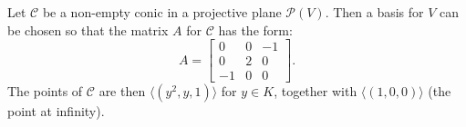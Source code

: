 Let $\mathcal{C}$ be a non-empty conic in a projective plane $\mathcal{P}(V)$. Then a basis for $V$ can be chosen so that the matrix $A$ for $\mathcal{C}$ has the form:
$$A = \begin{bmatrix} 0 & 0 & -1 \\ 0 & 2 & 0 \\ -1 & 0 & 0 \end{bmatrix}.$$
The points of $\mathcal{C}$ are then $\langle (y^2, y, 1) \rangle$ for $y \in K$, together with $\langle (1, 0, 0) \rangle$ (the point at infinity).
